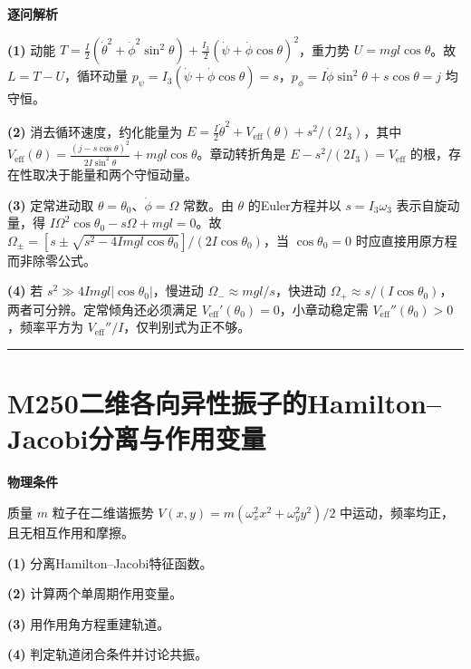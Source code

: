 \documentclass[UTF8,a4paper,11pt,oneside,openany]{ctexbook}
\begin{document}
\par\medskip\noindent\textbf{逐问解析}
\par\noindent\textbf{(1)} 动能 \(T=\tfrac I2(\dot\theta^2+\dot\phi^2\sin^2\theta)+\tfrac{I_3}{2}(\dot\psi+\dot\phi\cos\theta)^2\)，重力势 \(U=mgl\cos\theta\)。故 \(L=T-U\)，循环动量 \(p_\psi=I_3(\dot\psi+\dot\phi\cos\theta)=s\)，\(p_\phi=I\dot\phi\sin^2\theta+s\cos\theta=j\) 均守恒。
\par\noindent\textbf{(2)} 消去循环速度，约化能量为 \(E=\tfrac I2\dot\theta^2+V_{\mathrm{eff}}(\theta)+s^2/(2I_3)\)，其中 \(V_{\mathrm{eff}}(\theta)=\frac{(j-s\cos\theta)^2}{2I\sin^2\theta}+mgl\cos\theta\)。章动转折角是 \(E-s^2/(2I_3)=V_{\mathrm{eff}}\) 的根，存在性取决于能量和两个守恒动量。
\par\noindent\textbf{(3)} 定常进动取 \(\theta=\theta_0\)、\(\dot\phi=\Omega\) 常数。由 \(\theta\) 的Euler方程并以 \(s=I_3\omega_3\) 表示自旋动量，得 \(I\Omega^2\cos\theta_0-s\Omega+mgl=0\)。故 \(\Omega_\pm=[s\pm\sqrt{s^2-4Imgl\cos\theta_0}]/(2I\cos\theta_0)\)，当 \(\cos\theta_0=0\) 时应直接用原方程而非除零公式。
\par\noindent\textbf{(4)} 若 \(s^2\gg 4Imgl|\cos\theta_0|\)，慢进动 \(\Omega_-\approx mgl/s\)，快进动 \(\Omega_+\approx s/(I\cos\theta_0)\)，两者可分辨。定常倾角还必须满足 \(V_{\mathrm{eff}}'(\theta_0)=0\)，小章动稳定需 \(V_{\mathrm{eff}}''(\theta_0)>0\)，频率平方为 \(V_{\mathrm{eff}}''/I\)，仅判别式为正不够。

\par\bigskip\hrule\bigskip
\section*{M250\quad 二维各向异性振子的Hamilton–Jacobi分离与作用变量}
\textbf{物理条件}\par 质量 \(m\) 粒子在二维谐振势 \(V(x,y)=m(\omega_x^2x^2+\omega_y^2y^2)/2\) 中运动，频率均正，且无相互作用和摩擦。
\par\noindent\textbf{(1)} 分离Hamilton–Jacobi特征函数。
\par\noindent\textbf{(2)} 计算两个单周期作用变量。
\par\noindent\textbf{(3)} 用作用角方程重建轨道。
\par\noindent\textbf{(4)} 判定轨道闭合条件并讨论共振。
\end{document}
